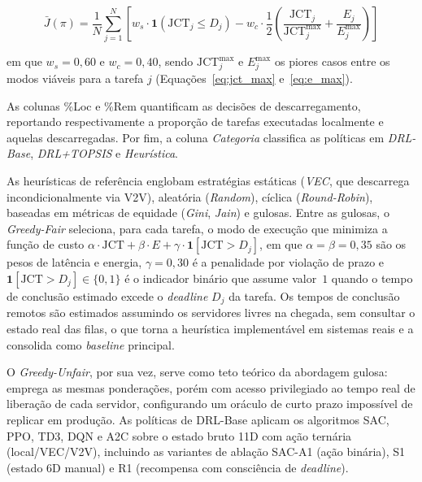 \begin{equation}
    \bar{J}(\pi) = \frac{1}{N} \sum_{j=1}^N \left[ w_s \cdot \mathbf{1}(\text{JCT}_j \leq D_j) - w_c \cdot \frac{1}{2}\!\left(\frac{\text{JCT}_j}{\text{JCT}^{\max}_j} + \frac{E_j}{E^{\text{max}}_j}\right) \right]
    \label{eq:obj_agregado}
\end{equation}

\noindent em que $w_s=0{,}60$ e $w_c=0{,}40$, sendo $\text{JCT}^{\max}_j$ e $E^{\text{max}}_j$ os piores casos entre os modos viáveis para a tarefa $j$ (Equações~\ref{eq:jct_max} e~\ref{eq:e_max}).

As colunas \%Loc e \%Rem quantificam as decisões de descarregamento, reportando respectivamente a proporção de tarefas executadas localmente e aquelas descarregadas. Por fim, a coluna \textit{Categoria} classifica as políticas em \textit{DRL-Base}, \textit{DRL+TOPSIS} e \textit{Heurística}.

As heurísticas de referência englobam estratégias estáticas (\textit{VEC}, que descarrega incondicionalmente via \gls{V2V}), aleatória (\textit{Random}), cíclica (\textit{Round-Robin}), baseadas em métricas de equidade (\textit{Gini}, \textit{Jain}) e gulosas. Entre as gulosas, o \textit{Greedy-Fair} seleciona, para cada tarefa, o modo de execução que minimiza a função de custo
$\alpha \cdot \mathrm{JCT} + \beta \cdot E + \gamma \cdot \mathbf{1}[\mathrm{JCT} > D_j]$,
em que $\alpha = \beta = 0{,}35$ são os pesos de latência e energia, $\gamma = 0{,}30$ é a penalidade por violação de prazo e $\mathbf{1}[\mathrm{JCT} > D_j] \in \{0,1\}$ é o indicador binário que assume valor~$1$ quando o tempo de conclusão estimado excede o \textit{deadline} $D_j$ da tarefa. Os tempos de conclusão remotos são estimados assumindo os servidores livres na chegada, sem consultar o estado real das filas, o que torna a heurística implementável em sistemas reais e a consolida como \textit{baseline} principal.

O \textit{Greedy-Unfair}, por sua vez, serve como teto teórico da abordagem gulosa: emprega as mesmas ponderações, porém com acesso privilegiado ao tempo real de liberação de cada servidor, configurando um oráculo de curto prazo impossível de replicar em produção. As políticas de \gls{DRL}-Base aplicam os algoritmos \gls{SAC}, \gls{PPO}, \gls{TD3}, \gls{DQN} e \gls{A2C} sobre o estado bruto 11D com ação ternária (local/\gls{VEC}/\gls{V2V}), incluindo as variantes de ablação \gls{SAC}-A1 (ação binária), S1 (estado 6D manual) e R1 (recompensa com consciência de \textit{deadline}).

